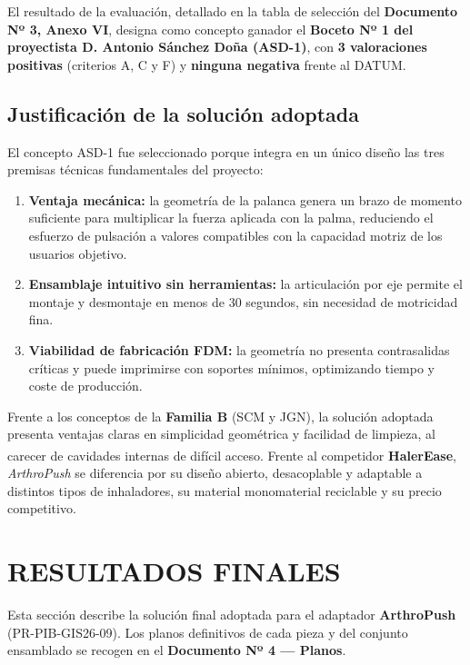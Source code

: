 \documentclass[11pt,a4paper]{article}
\begin{document}
El resultado de la evaluación, detallado en la tabla de selección del \textbf{Documento Nº 3, Anexo VI}, designa como concepto ganador el \textbf{Boceto Nº 1 del proyectista D. Antonio Sánchez Doña (ASD-1)}, con \textbf{3 valoraciones positivas} (criterios A, C y F) y \textbf{ninguna negativa} frente al DATUM.

\subsection{Justificación de la solución adoptada}

El concepto ASD-1 fue seleccionado porque integra en un único diseño las tres premisas técnicas fundamentales del proyecto:

\begin{enumerate}
    \item \textbf{Ventaja mecánica:} la geometría de la palanca genera un brazo de momento suficiente para multiplicar la fuerza aplicada con la palma, reduciendo el esfuerzo de pulsación a valores compatibles con la capacidad motriz de los usuarios objetivo.
    \item \textbf{Ensamblaje intuitivo sin herramientas:} la articulación por eje permite el montaje y desmontaje en menos de 30 segundos, sin necesidad de motricidad fina.
    \item \textbf{Viabilidad de fabricación FDM:} la geometría no presenta contrasalidas críticas y puede imprimirse con soportes mínimos, optimizando tiempo y coste de producción.
\end{enumerate}

Frente a los conceptos de la \textbf{Familia B} (SCM y JGN), la solución adoptada presenta ventajas claras en simplicidad geométrica y facilidad de limpieza, al carecer de cavidades internas de difícil acceso. Frente al competidor \textbf{HalerEase\textsuperscript{\textregistered}}, \textit{ArthroPush} se diferencia por su diseño abierto, desacoplable y adaptable a distintos tipos de inhaladores, su material monomaterial reciclable y su precio competitivo.

\newpage
\section{RESULTADOS FINALES}

Esta sección describe la solución final adoptada para el adaptador \textbf{ArthroPush} (PR-PIB-GIS26-09). Los planos definitivos de cada pieza y del conjunto ensamblado se recogen en el \textbf{Documento Nº 4 — Planos}.
\end{document}
